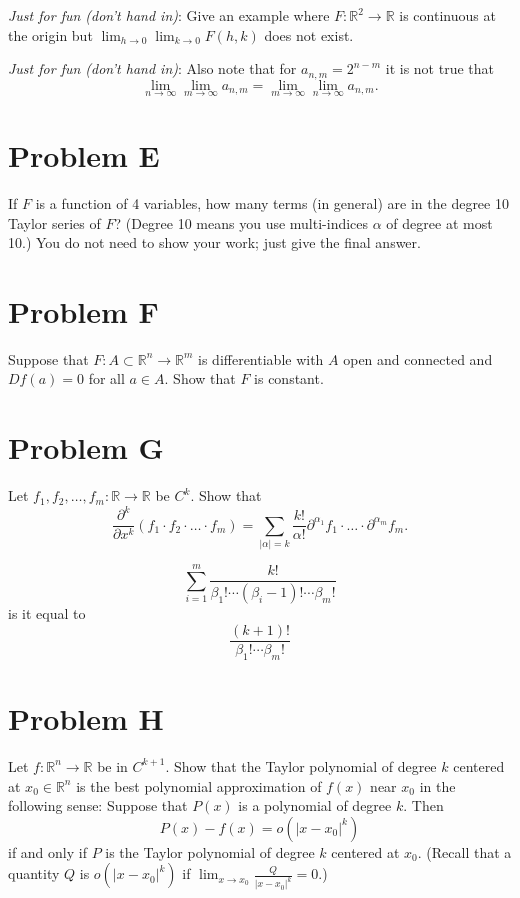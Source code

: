\documentclass[lang=en,11pt]{template}
\begin{document}
\textit{Just for fun (don’t hand in)}: Give an example where $F : \mathbb{R}^2 \to \mathbb{R}$ is continuous at the origin but $\lim_{h \to 0} \lim_{k \to 0} F(h, k)$ does not exist.

\textit{Just for fun (don’t hand in)}: Also note that for $a_{n,m} = 2^{n-m}$ it is not true that
\[
\lim_{n \to \infty} \lim_{m \to \infty} a_{n,m} = \lim_{m \to \infty} \lim_{n \to \infty} a_{n,m}.
\]

\section*{Problem E}
If $F$ is a function of 4 variables, how many terms (in general) are in the degree 10 Taylor series of $F$? (Degree 10 means you use multi-indices $\alpha$ of degree at most 10.) You do not need to show your work; just give the final answer.

\section*{Problem F}
Suppose that $F : A \subset \mathbb{R}^n \to \mathbb{R}^m$ is differentiable with $A$ open and connected and $Df(a) = 0$ for all $a \in A$. Show that $F$ is constant.

\section*{Problem G}
Let $f_1, f_2, \ldots, f_m : \mathbb{R} \to \mathbb{R}$ be $C^k$. Show that
\[
\frac{\partial^k}{\partial x^k}(f_1 \cdot f_2 \cdot \ldots \cdot f_m) = \sum_{|\alpha| = k} \frac{k!}{\alpha!} \partial^{\alpha_1} f_1 \cdot \ldots \cdot \partial^{\alpha_m} f_m.
\]


$$
\sum_{i=1}^m \frac{k!}{\beta_1 ! \cdots (\beta_i- 1)! \cdots \beta_m !}
$$
is it equal to 
$$
 \frac{(k+1)!}{\beta_1 !  \cdots \beta_m !}
$$


\section*{Problem H}
Let $f : \mathbb{R}^n \to \mathbb{R}$ be in $C^{k+1}$. Show that the Taylor polynomial of degree $k$ centered at $x_0 \in \mathbb{R}^n$ is the best polynomial approximation of $f(x)$ near $x_0$ in the following sense: Suppose that $P(x)$ is a polynomial of degree $k$. Then
\[
P(x) - f(x) = o(|x - x_0|^k)
\]
if and only if $P$ is the Taylor polynomial of degree $k$ centered at $x_0$. (Recall that a quantity $Q$ is $o(|x - x_0|^k)$ if $\lim_{x \to x_0} \frac{Q}{|x - x_0|^k} = 0$.)
\end{document}
